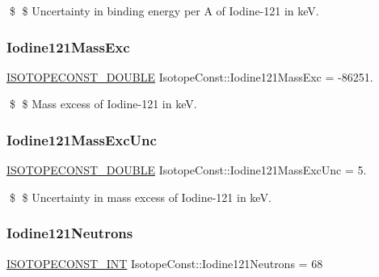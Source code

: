 \$ \$ Uncertainty in binding energy per A of Iodine-\/121 in keV. \mbox{\label{group___isotope_const-_iodine-_i121_ga25ad1f686ae93182d540db547f14e554}} 
\subsubsection{\texorpdfstring{Iodine121\+Mass\+Exc}{Iodine121MassExc}}
{\footnotesize\ttfamily \mbox{\hyperlink{group___isotope_const-_macros_ga8f45a7272ce02c0b4c65c44636ed719a}{I\+S\+O\+T\+O\+P\+E\+C\+O\+N\+S\+T\+\_\+\+D\+O\+U\+B\+LE}} Isotope\+Const\+::\+Iodine121\+Mass\+Exc = -\/86251.}

\$ \$ Mass excess of Iodine-\/121 in keV. \mbox{\label{group___isotope_const-_iodine-_i121_ga8566aa015c7ade5305faa4a9c727ad09}} 
\subsubsection{\texorpdfstring{Iodine121\+Mass\+Exc\+Unc}{Iodine121MassExcUnc}}
{\footnotesize\ttfamily \mbox{\hyperlink{group___isotope_const-_macros_ga8f45a7272ce02c0b4c65c44636ed719a}{I\+S\+O\+T\+O\+P\+E\+C\+O\+N\+S\+T\+\_\+\+D\+O\+U\+B\+LE}} Isotope\+Const\+::\+Iodine121\+Mass\+Exc\+Unc = 5.}

\$ \$ Uncertainty in mass excess of Iodine-\/121 in keV. \mbox{\label{group___isotope_const-_iodine-_i121_ga893742ce9ba735a7a9d3254a499a251d}} 
\subsubsection{\texorpdfstring{Iodine121\+Neutrons}{Iodine121Neutrons}}
{\footnotesize\ttfamily \mbox{\hyperlink{group___isotope_const-_macros_ga5f18360b3e99483a35c32d789e62621c}{I\+S\+O\+T\+O\+P\+E\+C\+O\+N\+S\+T\+\_\+\+I\+NT}} Isotope\+Const\+::\+Iodine121\+Neutrons = 68}

